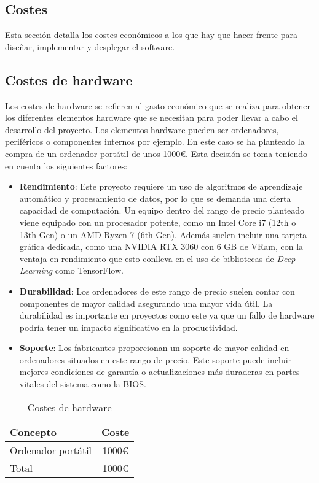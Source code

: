 \subsection{Costes}
Esta sección detalla los costes económicos a los que hay que hacer frente para diseñar, implementar y desplegar el software.

\subsection{Costes de hardware}
Los costes de hardware se refieren al gasto económico que se realiza para obtener los diferentes elementos hardware que se necesitan para poder llevar a cabo el desarrollo del proyecto. Los elementos hardware pueden ser ordenadores, periféricos o componentes internos por ejemplo.
En este caso se ha planteado la compra de un ordenador portátil de unos 1000€. Esta decisión se toma teníendo en cuenta los siguientes factores:

\begin{itemize}
\tightlist
\item \textbf{Rendimiento}: Este proyecto requiere un uso de algoritmos de aprendizaje automático y procesamiento de datos, por lo que se demanda una cierta capacidad de computación. 
Un equipo dentro del rango de precio planteado viene equipado con un procesador potente, como un Intel Core i7 (12th o 13th Gen) o un AMD Ryzen 7 (6th Gen). Además suelen incluir una tarjeta gráfica dedicada, como una NVIDIA RTX 3060 con 6 GB de VRam, con la ventaja en rendimiento que esto conlleva en el uso de bibliotecas de \textit{Deep Learning} como TensorFlow.

\item \textbf{Durabilidad}: Los ordenadores de este rango de precio suelen contar con componentes de mayor calidad asegurando una mayor vida útil. La durabilidad es importante en proyectos como este ya que un fallo de hardware podría tener un impacto significativo en la productividad.

\item \textbf{Soporte}: Los fabricantes proporcionan un soporte de mayor calidad en ordenadores situados en este rango de precio. Este soporte puede incluir mejores condiciones de garantía o actualizaciones más duraderas en partes vitales del sistema como la BIOS.
\end{itemize}

\begin{table}[h]
\centering
\begin{tabular}{|l|c|}
\hline
\textbf{Concepto} & \textbf{Coste} \\ 
\hline
Ordenador portátil & 1000€ \\ 
\hline
Total & 1000€ \\ 
\hline
\end{tabular}
\caption{Costes de hardware}
\end{table}

